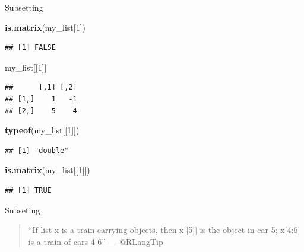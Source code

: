 \documentclass[ignorenonframetext,]{beamer}
\newenvironment{Shaded}{\begin{snugshade}}{\end{snugshade}}
\newcommand{\DecValTok}[1]{\textcolor[rgb]{0.00,0.00,0.81}{#1}}
\newcommand{\KeywordTok}[1]{\textcolor[rgb]{0.13,0.29,0.53}{\textbf{#1}}}
\newcommand{\NormalTok}[1]{#1}
\begin{document}
\begin{frame}[fragile]{Subsetting}
\protect\hypertarget{subsetting-2}{}

\begin{Shaded}
\begin{Highlighting}[]
\KeywordTok{is.matrix}\NormalTok{(my_list[}\DecValTok{1}\NormalTok{])}
\end{Highlighting}
\end{Shaded}

\begin{verbatim}
## [1] FALSE
\end{verbatim}

\begin{Shaded}
\begin{Highlighting}[]
\NormalTok{my_list[[}\DecValTok{1}\NormalTok{]]}
\end{Highlighting}
\end{Shaded}

\begin{verbatim}
##      [,1] [,2]
## [1,]    1   -1
## [2,]    5    4
\end{verbatim}

\begin{Shaded}
\begin{Highlighting}[]
\KeywordTok{typeof}\NormalTok{(my_list[[}\DecValTok{1}\NormalTok{]])}
\end{Highlighting}
\end{Shaded}

\begin{verbatim}
## [1] "double"
\end{verbatim}

\begin{Shaded}
\begin{Highlighting}[]
\KeywordTok{is.matrix}\NormalTok{(my_list[[}\DecValTok{1}\NormalTok{]])}
\end{Highlighting}
\end{Shaded}

\begin{verbatim}
## [1] TRUE
\end{verbatim}

\end{frame}

\begin{frame}{Subseting}
\protect\hypertarget{subseting}{}

\begin{quote}
``If list x is a train carrying objects, then x{[}{[}5{]}{]} is the
object in car 5; x{[}4:6{]} is a train of cars 4-6'' \hfill ---
@RLangTip
\end{quote}

\end{frame}
\end{document}
